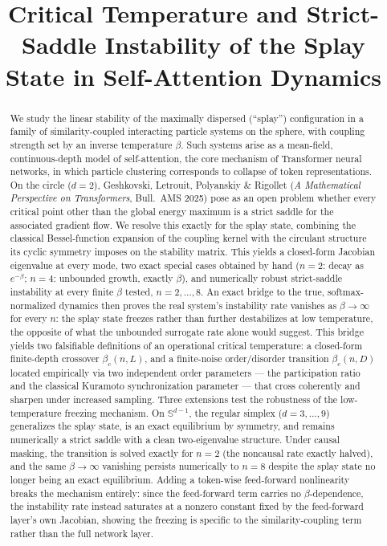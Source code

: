 \documentclass[11pt]{article}
\title{Critical Temperature and Strict-Saddle Instability of the Splay State in Self-Attention Dynamics}
\author{}
\date{}
\begin{document}
\maketitle

\begin{abstract}
We study the linear stability of the maximally dispersed (``splay'') configuration in a family of similarity-coupled interacting particle systems on the sphere, with coupling strength set by an inverse temperature $\beta$. Such systems arise as a mean-field, continuous-depth model of self-attention, the core mechanism of Transformer neural networks, in which particle clustering corresponds to collapse of token representations. On the circle ($d=2$), Geshkovski, Letrouit, Polyanskiy \& Rigollet (\emph{A Mathematical Perspective on Transformers}, Bull.\ AMS 2025) pose as an open problem whether every critical point other than the global energy maximum is a strict saddle for the associated gradient flow. We resolve this exactly for the splay state, combining the classical Bessel-function expansion of the coupling kernel with the circulant structure its cyclic symmetry imposes on the stability matrix. This yields a closed-form Jacobian eigenvalue at every mode, two exact special cases obtained by hand ($n=2$: decay as $e^{-\beta}$; $n=4$: unbounded growth, exactly $\beta$), and numerically robust strict-saddle instability at every finite $\beta$ tested, $n=2,\dots,8$. An exact bridge to the true, softmax-normalized dynamics then proves the real system's instability rate vanishes as $\beta\to\infty$ for every $n$: the splay state freezes rather than further destabilizes at low temperature, the opposite of what the unbounded surrogate rate alone would suggest. This bridge yields two falsifiable definitions of an operational critical temperature: a closed-form finite-depth crossover $\beta_c(n,L)$, and a finite-noise order/disorder transition $\beta_c(n,D)$ located empirically via two independent order parameters --- the participation ratio and the classical Kuramoto synchronization parameter --- that cross coherently and sharpen under increased sampling. Three extensions test the robustness of the low-temperature freezing mechanism. On $\mathbb{S}^{d-1}$, the regular simplex ($d=3,\dots,9$) generalizes the splay state, is an exact equilibrium by symmetry, and remains numerically a strict saddle with a clean two-eigenvalue structure. Under causal masking, the transition is solved exactly for $n=2$ (the noncausal rate exactly halved), and the same $\beta\to\infty$ vanishing persists numerically to $n=8$ despite the splay state no longer being an exact equilibrium. Adding a token-wise feed-forward nonlinearity breaks the mechanism entirely: since the feed-forward term carries no $\beta$-dependence, the instability rate instead saturates at a nonzero constant fixed by the feed-forward layer's own Jacobian, showing the freezing is specific to the similarity-coupling term rather than the full network layer.
\end{abstract}
\end{document}
